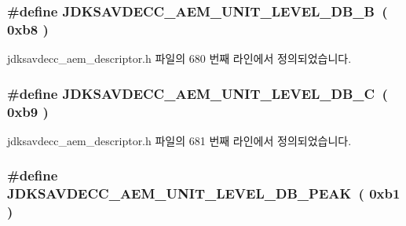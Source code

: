 \subsubsection[{\texorpdfstring{J\+D\+K\+S\+A\+V\+D\+E\+C\+C\+\_\+\+A\+E\+M\+\_\+\+U\+N\+I\+T\+\_\+\+L\+E\+V\+E\+L\+\_\+\+D\+B\+\_\+B}{JDKSAVDECC_AEM_UNIT_LEVEL_DB_B}}]{\setlength{\rightskip}{0pt plus 5cm}\#define J\+D\+K\+S\+A\+V\+D\+E\+C\+C\+\_\+\+A\+E\+M\+\_\+\+U\+N\+I\+T\+\_\+\+L\+E\+V\+E\+L\+\_\+\+D\+B\+\_\+B~( 0xb8 )}\hypertarget{group__units_ga27888502427e8d1624cf189560b21ed1}{}\label{group__units_ga27888502427e8d1624cf189560b21ed1}


jdksavdecc\+\_\+aem\+\_\+descriptor.\+h 파일의 680 번째 라인에서 정의되었습니다.

\subsubsection[{\texorpdfstring{J\+D\+K\+S\+A\+V\+D\+E\+C\+C\+\_\+\+A\+E\+M\+\_\+\+U\+N\+I\+T\+\_\+\+L\+E\+V\+E\+L\+\_\+\+D\+B\+\_\+C}{JDKSAVDECC_AEM_UNIT_LEVEL_DB_C}}]{\setlength{\rightskip}{0pt plus 5cm}\#define J\+D\+K\+S\+A\+V\+D\+E\+C\+C\+\_\+\+A\+E\+M\+\_\+\+U\+N\+I\+T\+\_\+\+L\+E\+V\+E\+L\+\_\+\+D\+B\+\_\+C~( 0xb9 )}\hypertarget{group__units_ga987ca399d155f8b9fdb73ff7928075ca}{}\label{group__units_ga987ca399d155f8b9fdb73ff7928075ca}


jdksavdecc\+\_\+aem\+\_\+descriptor.\+h 파일의 681 번째 라인에서 정의되었습니다.

\subsubsection[{\texorpdfstring{J\+D\+K\+S\+A\+V\+D\+E\+C\+C\+\_\+\+A\+E\+M\+\_\+\+U\+N\+I\+T\+\_\+\+L\+E\+V\+E\+L\+\_\+\+D\+B\+\_\+\+P\+E\+AK}{JDKSAVDECC_AEM_UNIT_LEVEL_DB_PEAK}}]{\setlength{\rightskip}{0pt plus 5cm}\#define J\+D\+K\+S\+A\+V\+D\+E\+C\+C\+\_\+\+A\+E\+M\+\_\+\+U\+N\+I\+T\+\_\+\+L\+E\+V\+E\+L\+\_\+\+D\+B\+\_\+\+P\+E\+AK~( 0xb1 )}\hypertarget{group__units_gaf54f775ea6b45d6c45cfffb08b0fdb30}{}\label{group__units_gaf54f775ea6b45d6c45cfffb08b0fdb30}


